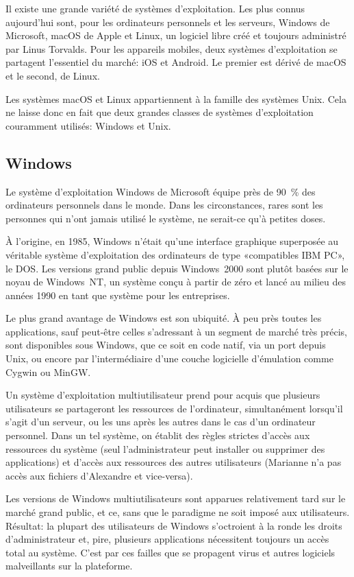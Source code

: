 Il existe une grande variété de systèmes d'exploitation. Les plus
connus aujourd'hui sont, pour les ordinateurs personnels et les
serveurs, Windows de Microsoft, macOS de Apple et Linux, un logiciel
libre créé et toujours administré par Linus Torvalds. Pour les
appareils mobiles, deux systèmes d'exploitation se partagent
l'essentiel du marché: iOS et Android. Le premier est dérivé de macOS
et le second, de Linux.

Les systèmes macOS et Linux appartiennent à la famille des systèmes
Unix. Cela ne laisse donc en fait que deux grandes classes de systèmes
d'exploitation couramment utilisés: Windows et Unix.

\subsection{Windows}
\label{sec:informatique:os:windows}

Le système d'exploitation Windows de Microsoft équipe
près de 90~\% des ordinateurs personnels dans le monde. Dans les
circonstances, rares sont les personnes qui n'ont jamais utilisé le
système, ne serait-ce qu'à petites doses.

À l'origine, en 1985, Windows n'était qu'une interface graphique
superposée au véritable système d'exploitation des ordinateurs de type
«compatibles IBM PC», le DOS. Les versions grand public depuis
Windows~2000 sont plutôt basées sur le noyau de Windows~NT, un système
conçu à partir de zéro et lancé au milieu des années 1990 en tant que
système pour les entreprises.

Le plus grand avantage de Windows est son ubiquité. À peu près toutes
les applications, sauf peut-être celles s'adressant à un segment de
marché très précis, sont disponibles sous Windows, que ce soit en code
natif, via un port depuis Unix, ou encore par l'intermédiaire d'une
couche logicielle d'émulation comme Cygwin ou MinGW.

Un système d'exploitation multiutilisateur prend pour acquis que
plusieurs utilisateurs se partageront les ressources de l'ordinateur,
simultanément lorsqu'il s'agit d'un serveur, ou les uns après les
autres dans le cas d'un ordinateur personnel. Dans un tel système, on
établit des règles strictes d'accès aux ressources du système (seul
l'administrateur peut installer ou supprimer des applications) et
d'accès aux ressources des autres utilisateurs (Marianne n'a pas
accès aux fichiers d'Alexandre et vice-versa).

Les versions de Windows multiutilisateurs sont apparues relativement
tard sur le marché grand public, et ce, sans que le paradigme ne soit
imposé aux utilisateurs. Résultat: la plupart des utilisateurs de
Windows s'octroient à la ronde les droits d'administrateur et, pire,
plusieurs applications nécessitent toujours un accès total au système.
C'est par ces failles que se propagent virus et autres logiciels
malveillants sur la plateforme.

